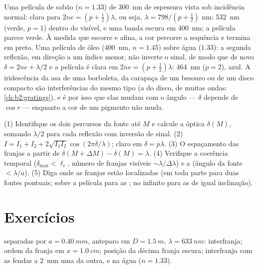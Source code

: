 \begin{example}\label{ex:b2:two-wave-interference:colours}
Uma película de sabão ($n = 1.33$) de \qty{300}{nm} de espessura vista sob incidência normal:
clara para $2ne = (p + \tfrac12)\lambda$, ou seja, $\lambda = 798/(p + \tfrac12)$ nm: \qty{532}{nm}
(verde, $p = 1$) dentro do visível, e uma banda escura em \qty{400}{nm}; a
película parece verde. À medida que escorre e afina, a cor percorre a
sequência e termina em preto. Uma película de óleo (\qty{400}{nm}, $n = 1.45$) sobre água
($1.33$): a segunda reflexão, em direção a um índice menor, não inverte
o sinal, de modo que de novo $\delta = 2ne + \lambda/2$ e a película é clara em $2ne =
(p + \tfrac12)\lambda$: \qty{464}{nm} ($p = 2$), azul. A iridescência da asa de uma
borboleta, da carapaça de um besouro ou de um disco compacto são interferências
do mesmo tipo (a do disco, de muitas ondas: \cref{ch:b2:gratings}),
e é por isso que elas mudam com o ângulo --- $\delta$ depende de $\cos r$ ---
enquanto a cor de um pigmento não muda.
\end{example}

\begin{method}\label{met:b2:two-wave-interference:method}
(1) Identifique os dois percursos da fonte até $M$ e calcule a
 óptica $\delta(M)$, somando $\lambda/2$ para cada reflexão
com inversão de sinal. (2) $I = I_1 + I_2 + 2\sqrt{I_1I_2}\cos(2\pi\delta/\lambda)$;
claro em $\delta = p\lambda$. (3) O espaçamento das franjas a partir de $\delta(M + \Delta M) - \delta(M) =
\lambda$. (4) Verifique a coerência temporal ($\delta_{\max} < \ell_c$, número de
franjas visíveis $\sim\lambda/\Delta\lambda$) e a  (ângulo da fonte
$< \lambda/a$). (5) Diga onde as franjas estão localizadas (em toda parte para duas
fontes pontuais; sobre a película para as ; no infinito
para as de igual inclinação).
\end{method}

\section{Exercícios}

\begin{exercise}[$\star$]\label{exo:b2:two-wave-interference:1}
 separadas por $a = \qty{0.40}{mm}$, anteparo em $D = \qty{1.5}{m}$, $\lambda =
\qty{633}{nm}$: interfranja; ordem da franja em $x = \qty{1.0}{cm}$; posição
da décima franja escura; interfranja com as fendas a \qty{2}{mm} uma da outra,
e na água ($n = 1.33$).
\end{exercise}


